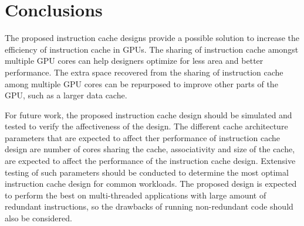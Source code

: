 \section{Conclusions}

The proposed instruction cache designs provide a possible solution to increase the efficiency of instruction cache in GPUs. The sharing of instruction cache amongst multiple GPU cores can help designers optimize for less area and better performance. The extra space recovered from the sharing of instruction cache among multiple GPU cores can be repurposed to improve other parts of the GPU, such as a larger data cache.

For future work, the proposed instruction cache design should be simulated and tested to verify the affectiveness of the design. The different cache architecture parameters that are expected to affect ther performance of instruction cache design are number of cores sharing the cache, associativity and size of the cache, are expected to affect the performance of the instruction cache design. Extensive testing of such parameters should be conducted to determine the most optimal instruction cache design for common workloads. The proposed design is expected to perform the best on multi-threaded applications with large amount of redundant instructions, so the drawbacks of running non-redundant code should also be considered.
